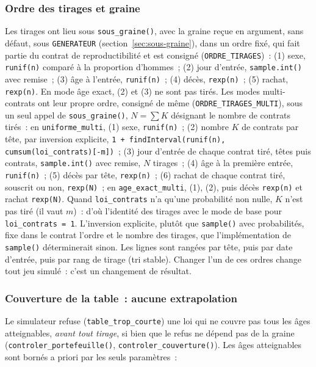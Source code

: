 \documentclass[a4paper,11pt]{article}
\newcommand{\code}[1]{\texttt{\small #1}}
\begin{document}
\subsubsection*{Ordre des tirages et graine}

Les tirages ont lieu sous \code{sous\_graine()}, avec la graine reçue en
argument, sans défaut, sous \code{GENERATEUR} (section~\ref{sec:sous-graine}),
dans un ordre fixé, qui fait partie du contrat de reproductibilité et est
consigné (\code{ORDRE\_TIRAGES})~: (1) sexe, \code{runif(n)} comparé à la
proportion d'hommes~; (2) jour d'entrée, \code{sample.int()} avec remise~;
(3) âge à l'entrée, \code{runif(n)}~; (4) décès, \code{rexp(n)}~; (5) rachat,
\code{rexp(n)}. En mode âge exact, (2) et (3) ne sont pas tirés. Les modes
multi-contrats ont leur propre ordre, consigné de même
(\code{ORDRE\_TIRAGES\_MULTI}), sous un seul appel de \code{sous\_graine()},
$N = \sum K$ désignant le nombre de contrats tirés~: en
\code{uniforme\_multi}, (1) sexe, \code{runif(n)}~; (2) nombre $K$ de
contrats par tête, par inversion explicite,
\code{1 + findInterval(runif(n), cumsum(loi\_contrats)[-m])}~; (3) jour
d'entrée de chaque contrat tiré, têtes puis contrats, \code{sample.int()}
avec remise, $N$ tirages~; (4) âge à la première entrée, \code{runif(n)}~;
(5) décès par tête, \code{rexp(n)}~; (6) rachat de chaque contrat tiré,
souscrit ou non, \code{rexp(N)}~; en \code{age\_exact\_multi}, (1), (2),
puis décès \code{rexp(n)} et rachat \code{rexp(N)}. Quand
\code{loi\_contrats} n'a qu'une probabilité non nulle, $K$ n'est pas tiré
(il vaut $m$)~: d'où l'identité des tirages avec le mode de base pour
\code{loi\_contrats = 1}. L'inversion explicite, plutôt que
\code{sample()} avec probabilités, fixe dans le contrat l'ordre et le nombre
des tirages, que l'implémentation de \code{sample()} déterminerait
sinon. Les lignes sont rangées par tête, puis par date d'entrée, puis par
rang de tirage (tri stable). Changer l'un de ces ordres change tout jeu
simulé~: c'est un changement de résultat.

\subsubsection*{Couverture de la table~: aucune extrapolation}

Le simulateur refuse (\code{table\_trop\_courte}) une loi qui ne couvre pas
tous les âges atteignables, \emph{avant tout tirage}, si bien que le refus ne
dépend pas de la graine (\code{controler\_portefeuille()},
\code{controler\_couverture()}). Les âges atteignables sont bornés a priori
par les seuls paramètres~:
\end{document}
